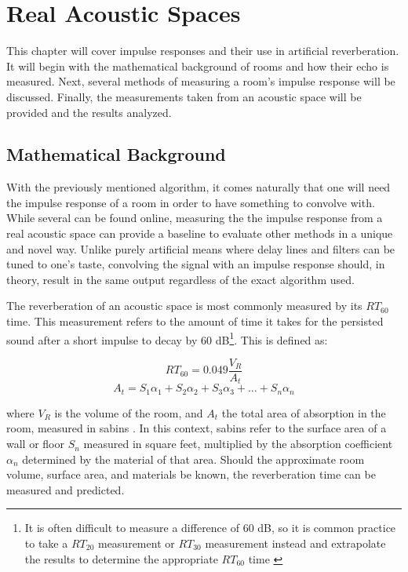 \chapter{Real Acoustic Spaces}
\hspace*{-0.15cm}This chapter will cover impulse responses and their use in artificial reverberation. It will begin with the mathematical background of rooms and how their echo is measured. Next, several methods of measuring a room's impulse response will be discussed. Finally, the measurements taken from an acoustic space will be provided and the results analyzed.

\section{Mathematical Background}
With the previously mentioned algorithm, it comes naturally that one will need the impulse response of a room in order to have something to convolve with. While several can be found online, measuring the the impulse response from a real acoustic space can provide a baseline to evaluate other methods in a unique and novel way. Unlike purely artificial means where delay lines and filters can be tuned to one's taste, convolving the signal with an impulse response should, in theory, result in the same output regardless of the exact algorithm used.

The reverberation of an acoustic space is most commonly measured by its $RT_{60}$ time. This measurement refers to the amount of time it takes for the persisted sound after a short impulse to decay by 60 dB\footnote{It is often difficult to measure a difference of 60 dB, so it is common practice to take a $RT_{20}$ measurement or $RT_{30}$ measurement instead and extrapolate the results to determine the appropriate $RT_{60}$ time \cite{larson}}. This is defined as:

\begin{defn}\label{def-complex}
	\begin{equation}\label{reverbtime-complex)}
	RT_{60} = 0.049 \frac{V_R}{A_{t}}
\end{equation}\begin{equation}\label{parttwo}
	A_t = S_1\alpha_1 + S_2\alpha_2 + S_3\alpha_3 + \ldots + S_n\alpha_n
\end{equation}
\end{defn}

where $V_R$ is the volume of the room, and $A_{t}$ the total area of absorption in the room, measured in sabins \cite{LONG2014313}. In this context, sabins refer to the surface area of a wall or floor $S_n$ measured in square feet, multiplied by the absorption coefficient $\alpha_n$ determined by the material of that area. Should the approximate room volume, surface area, and materials be known, the reverberation time can be measured and predicted.

